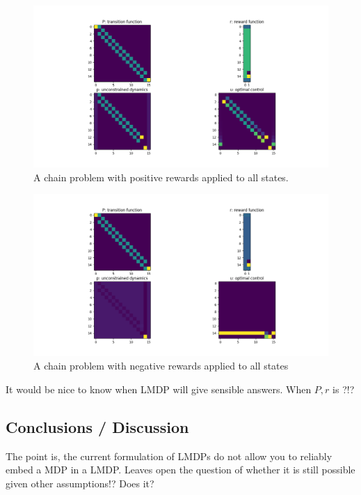 \begin{figure}
\centering
\includegraphics[width=1\textwidth,height=0.35\textheight]{../../pictures/figures/chain-test-pos-rewards.png}
\caption{A chain problem with positive rewards applied to all states.}
\end{figure}

\begin{figure}
\centering
\includegraphics[width=1\textwidth,height=0.35\textheight]{../../pictures/figures/chain-test-neg-rewards.png}
\caption{A chain problem with negative rewards applied to all states}
\end{figure}

It would be nice to know when LMDP will give sensible answers. When $P, r$ is ?!?

\subsection{Conclusions / Discussion}

The point is, the current formulation of LMDPs do not allow you to reliably embed a MDP in a LMDP.
Leaves open the question of whether it is still possible given other assumptions!? Does it?

